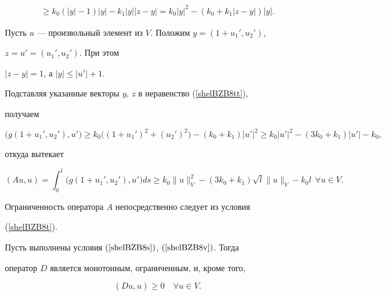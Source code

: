 \begin{pf}
\begin{multline}
%


\geq k_{0} (| y |-1) | y |-k_{1} | y | | z-y | =


k_{0} | y |^2-(k_{0}+k_{1} | z-y | ) | y |.


\label{shelBZB8tt}


\end{multline}





Пусть $u$ --- произвольный элемент из $V$. Положим $y=(1+u_1',u_2')$,


$z=u'=(u_1',u_2')$. При этом


$| z-y |= 1$, а $|y| \leq |u' |+1$.


Подставляя указанные векторы $y$, $z$ в неравенство (\ref{shelBZB8tt}),


получаем


$$


\big(g(1+u_1',u_2'), u' \big) \geq


k_{0} \big((1+u_1')^2+(u_2' )^2 \big) -


(k_{0}+k_{1} ) |u' |^2 \geq


k_{0} |u' |^2-(3 k_{0}+k_{1} ) |u'|-k_{0},


$$


откуда вытекает 


$$


(Au,u)= \int_{0}^{l}\big(g(1+u_1',u_2'), u' \big) ds


\geq k_{0} \| u \|_V^2-(3 k_{0}+k_{1} ) 


\sqrt {l} \| u \|_V-k_{0} l\ \ \forall u \in V.


$$





Ограниченность оператора $A$ непосредственно следует из условия


(\ref{shelBZB8t}).


\end{pf}





\begin{lem} \label{BZ_Izv05_L2}


Пусть выполнены условия $(\ref{shelBZB8s})$, $(\ref{shelBZB8v})$. Тогда


оператор $D$ является монотонным, ограниченным, и, кроме того,


\begin{equation}


(Du,u) \geq 0 \quad \forall u \in V.


\label{shelBZB8Dk}


\end{equation}


\end{lem}





